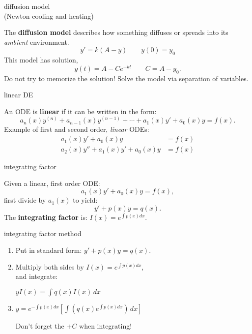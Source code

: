 \documentclass[avery5371,grid]{flashcards}
\newcommand{\defn}[1]{\textbf{#1}}
\begin{document}
\begin{flashcard}[Definition]{diffusion model \\ (Newton cooling and heating)}

  The \defn{diffusion model} describes how something diffuses or
  spreads into its \emph{ambient} environment.
  \[
    y' = k(A-y) \qquad y(0) = y_0
  \]
  This model has solution,
  \[
    y(t) = A - Ce^{-kt} \qquad C = A-y_0.
  \]
  Do not try to memorize the solution! Solve the model via separation
  of variables.

\end{flashcard}

\begin{flashcard}[Definition]{linear DE}

  An ODE is \defn{linear} if it can be written in the form:
  \[
    a_n(x)y^{(n)} + a_{n-1}(x)y^{(n-1)} + \cdots + a_1(x)y' + a_0(x)y
    = f(x).
  \]
  Example of first and second order, \emph{linear}  ODEs:
  \begin{align*}
    a_1(x)y' + a_0(x)y &= f(x) \\
    a_2(x)y'' + a_1(x)y' + a_0(x)y &= f(x)
  \end{align*}

\end{flashcard}

\begin{flashcard}[Definition]{integrating factor}

  Given a linear, first order ODE:
  \[
    a_1(x)y' + a_0(x)y = f(x),
  \]
  first divide by $a_1(x)$ to yield:
  \[
    y' + p(x)y = q(x).
  \]
  The \defn{integrating factor} is: \( I(x) = e^{\int \! p(x) dx}. \)

\end{flashcard}

\begin{flashcard}[Algorithm]{integrating factor method}

  \begin{enumerate}
  \item Put in standard form:
    \(
      y' + p(x)y = q(x).
    \)
  \item Multiply both sides by $I(x) = e^{\int\! p(x)dx}$, \\
    and integrate:

    \(
    y I(x) = \displaystyle \int q(x)I(x) \, dx
    \)
  \item
    \(
    y = \displaystyle e^{-\int\! p(x) dx}
    \left[ \int \left( q(x)e^{\int \!p(x) dx} \right)\, dx \right]
    \)

    Don't forget the $+C$ when integrating!
  \end{enumerate}

\end{flashcard}
\end{document}
